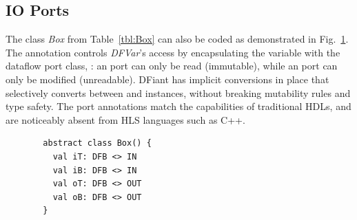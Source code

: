 \subsection{IO Ports}
\label{sec:io_ports}
The class \textit{Box} from Table~\ref{tbl:Box} can also be coded as demonstrated in Fig.~\ref{fig:IOBox}. The annotation  controls \textit{DFVar}'s access by encapsulating the variable with the dataflow port class, : an  port can only be read (immutable), while an  port can only be modified (unreadable). DFiant has implicit conversions in place that selectively converts between  and  instances, without breaking mutability rules and type safety. The port annotations match the capabilities of traditional HDLs, and are noticeably absent from HLS languages such as C++. 


\begin{figure}[h]
  \centering
  \begin{minipage}{0.4\linewidth}
  \begin{verbatim}
  abstract class Box() { 
    val iT: DFB <> IN
    val iB: DFB <> IN
    val oT: DFB <> OUT
    val oB: DFB <> OUT
  }
  \end{verbatim}
  \end{minipage}
  \label{fig:IOBox}
\end{figure}



%
%
%
%
%

